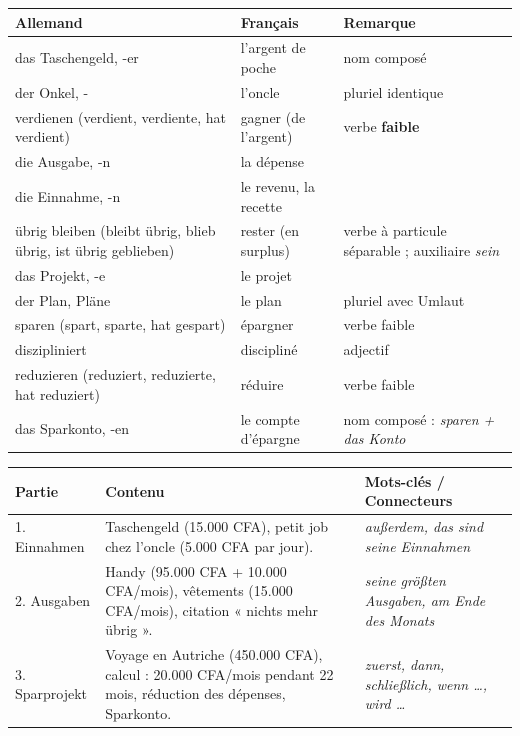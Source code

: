 \documentclass[11pt]{article}
\newcommand{\all}[1]{\ifmmode\text{\textit{#1}}\else\begingroup\selectlanguage{ngerman}\itshape #1\endgroup\fi}
\begin{document}
\begin{definition}
\begin{tabular}{|l|l|l|}
\hline
\rowcolor{popblueL}
\textbf{Allemand} & \textbf{Français} & \textbf{Remarque} \\
\hline
das Taschengeld, -er & l'argent de poche & nom composé \\
der Onkel, - & l'oncle & pluriel identique \\
verdienen (verdient, verdiente, hat verdient) & gagner (de l'argent) & verbe \textbf{faible} \\
die Ausgabe, -n & la dépense & \\
die Einnahme, -n & le revenu, la recette & \\
übrig bleiben (bleibt übrig, blieb übrig, ist übrig geblieben) & rester (en surplus) & verbe à particule séparable ; auxiliaire \all{sein} \\
das Projekt, -e & le projet & \\
der Plan, Pläne & le plan & pluriel avec Umlaut \\
sparen (spart, sparte, hat gespart) & épargner & verbe faible \\
diszipliniert & discipliné & adjectif \\
reduzieren (reduziert, reduzierte, hat reduziert) & réduire & verbe faible \\
das Sparkonto, -en & le compte d'épargne & nom composé : \all{sparen} + \all{das Konto} \\
\hline
\end{tabular}
\end{definition}

\begin{exemplebox}
\begin{tabular}{|p{2.5cm}|p{6cm}|p{5cm}|}
\hline
\rowcolor{popblueL}
\textbf{Partie} & \textbf{Contenu} & \textbf{Mots-clés / Connecteurs} \\
\hline
1. Einnahmen & Taschengeld (15.000 CFA), petit job chez l'oncle (5.000 CFA par jour). & \all{außerdem}, \all{das sind seine Einnahmen} \\
\hline
2. Ausgaben & Handy (95.000 CFA + 10.000 CFA/mois), vêtements (15.000 CFA/mois), citation « nichts mehr übrig ». & \all{seine größten Ausgaben}, \all{am Ende des Monats} \\
\hline
3. Sparprojekt & Voyage en Autriche (450.000 CFA), calcul : 20.000 CFA/mois pendant 22 mois, réduction des dépenses, Sparkonto. & \all{zuerst}, \all{dann}, \all{schließlich}, \all{wenn …, wird …} \\
\hline
\end{tabular}
\end{exemplebox}
\end{document}

